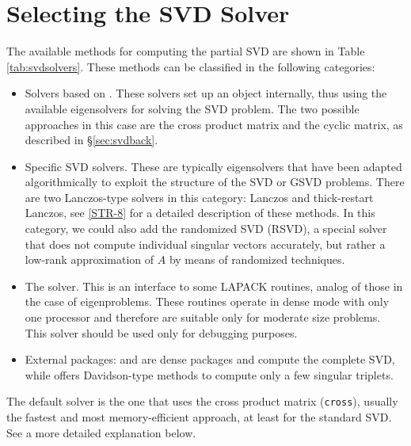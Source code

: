 \section{Selecting the SVD Solver}

The available methods for computing the partial SVD are shown in Table \ref{tab:svdsolvers}. These methods can be classified in the following categories:
\begin{itemize}
\item Solvers based on . These solvers set up an  object internally, thus using the available eigensolvers for solving the SVD problem. The two possible approaches in this case are the cross product matrix and the cyclic matrix, as described in \S\ref{sec:svdback}.
\item Specific SVD solvers. These are typically eigensolvers that have been adapted algorithmically to exploit the structure of the SVD or GSVD problems. There are two Lanczos-type solvers in this category: Lanczos and thick-restart Lanczos, see \hyperlink{str}{[STR-8]} for a detailed description of these methods. In this category, we could also add the randomized SVD (RSVD), a special solver that does not compute individual singular vectors accurately, but rather a low-rank approximation of $A$ by means of randomized techniques.
\item The \lapack solver. This is an interface to some LAPACK routines, analog of those in the case of eigenproblems. These routines operate in dense mode with only one processor and therefore are suitable only for moderate size problems. This solver should be used only for debugging purposes.
\item External packages: \scalapack and \elemental are dense packages and compute the complete SVD, while \primme offers Davidson-type methods to compute only a few singular triplets.
\end{itemize}
The default solver is the one that uses the cross product matrix (\texttt{cross}), usually the fastest and most memory-efficient approach, at least for the standard SVD. See a more detailed explanation below.

